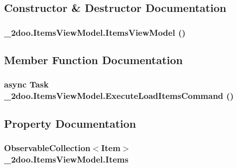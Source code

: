 \subsection{Constructor \& Destructor Documentation}
\hypertarget{class__2doo_1_1_items_view_model_4281e06f54ab11377669d674cf63ce82}{
\subsubsection[{ItemsViewModel}]{\setlength{\rightskip}{0pt plus 5cm}\_\-2doo.ItemsViewModel.ItemsViewModel ()}}
\label{class__2doo_1_1_items_view_model_4281e06f54ab11377669d674cf63ce82}




\subsection{Member Function Documentation}
\hypertarget{class__2doo_1_1_items_view_model_09ec826f5a7c85a5649d9565fc670f5d}{
\subsubsection[{ExecuteLoadItemsCommand}]{\setlength{\rightskip}{0pt plus 5cm}async Task \_\-2doo.ItemsViewModel.ExecuteLoadItemsCommand ()}}
\label{class__2doo_1_1_items_view_model_09ec826f5a7c85a5649d9565fc670f5d}




\subsection{Property Documentation}
\hypertarget{class__2doo_1_1_items_view_model_5cf46569e45e89891546f1eaeff55ba3}{
\subsubsection[{Items}]{\setlength{\rightskip}{0pt plus 5cm}ObservableCollection$<${\bf Item}$>$ \_\-2doo.ItemsViewModel.Items}}
\label{class__2doo_1_1_items_view_model_5cf46569e45e89891546f1eaeff55ba3}


